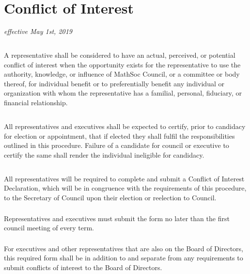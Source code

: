 \section{Conflict of Interest}
\emph{effective May 1st, 2019}

\subsection{}

A representative shall be considered to have an actual, perceived, or potential conflict of interest when the opportunity exists for the representative to use the authority, knowledge, or influence of MathSoc Council, or a committee or body thereof, for individual benefit or to preferentially benefit any individual or organization with whom the representative has a familial, personal, fiduciary, or financial relationship.

\subsection{}

All representatives and executives shall be expected to certify, prior to candidacy for election or appointment, that if elected they shall fulfil the responsibilities outlined in this procedure. Failure of a candidate for council or executive to certify the same shall render the individual ineligible for candidacy.

\subsection{}

All representatives will be required to complete and submit a Conflict of Interest Declaration, which will be in congruence with the requirements of this procedure, to the Secretary of Council upon their election or reelection to Council. 

\subsubsection{}

Representatives and executives must submit the form no later than the first council meeting of every term.

\subsubsection{}

For executives and other representatives that are also on the Board of Directors, this required form shall be in addition to and separate from any requirements to submit conflicts of interest to the Board of Directors.

